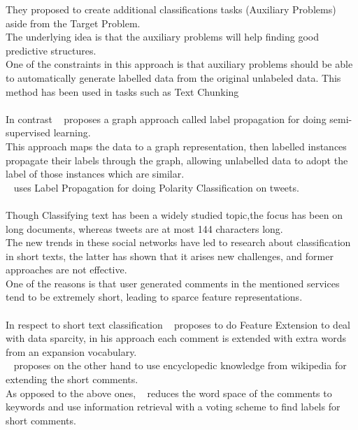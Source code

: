 \documentclass[4pt,a4paper,twocolumn]{article}
\begin{document}
They proposed to create additional classifications tasks (Auxiliary Problems) aside from the Target Problem.\\
The underlying idea is that the auxiliary problems will help finding good predictive structures.\\
One of the constraints in this approach is that auxiliary problems should be  able to automatically generate labelled data from the original unlabeled data.
This method has been used in tasks such as Text Chunking ~\cite{Ando:2005:HSL:1219840.1219841}\\
\\
In contrast ~\cite{Zhu:2005:SLG:1104523} proposes a graph approach called label propagation for
doing semi-supervised learning.\\
This approach maps the data to a graph representation, then labelled instances propagate their labels through the graph, allowing unlabelled data to adopt the label of those instances which are similar.\\
~\cite{Speriosu_twitterpolarity} uses Label Propagation for doing Polarity Classification on tweets.\\
\\
Though Classifying text has been a widely studied topic,the focus has been on long documents,
whereas tweets are at most 144 characters long.\\
The new trends in these social networks have led to research about classification in short texts, the latter has  shown that it arises new challenges, and former approaches are not  effective.\\
One of the reasons is that  user generated comments in the mentioned services tend to be extremely short, leading to sparce feature representations.\\
\\
In respect to short text classification ~\cite{Fan:2010:NMC:1916732.1917677} proposes  to do Feature Extension to deal with data sparcity, in his approach each comment is extended with extra words from an expansion vocabulary.\\
~\cite{Gabrilovich:2006:OBB:1597348.1597395} proposes on the other hand to use encyclopedic knowledge from wikipedia for extending the short comments.\\
As opposed to the above ones,  ~\cite{Sun:2012:STC:2348283.2348511} reduces the word space of the comments to keywords and use information retrieval with a voting scheme to find labels for short comments.\\
\\
\end{document}
